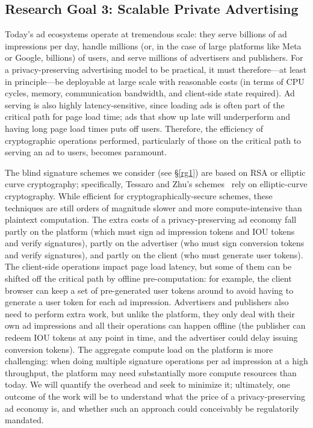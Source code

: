 \subsection{Research Goal 3: Scalable Private Advertising}
\label{s:rg3}

%
Today's ad ecosystems operate at tremendous scale: they serve billions of ad impressions per day, handle millions (or, in the case of large platforms like Meta or Google, billions) of users, and serve millions of advertisers and publishers.
%
For a privacy-preserving advertising model to be practical, it must therefore---at least in principle---be deployable at large scale with reasonable costs (in terms of CPU cycles, memory, communication bandwidth, and client-side state required).
%
Ad serving is also highly latency-sensitive, since loading ads is often part of the critical path for page load time; ads that show up late will underperform and having long page load times puts off users.
%
Therefore, the efficiency of cryptographic operations performed, particularly of those on the critical path to serving an ad to users, becomes paramount.
%

%
The blind signature schemes we consider (see \S\ref{rg1}) are based on RSA or elliptic curve cryptography; specifically, Tessaro and Zhu's schemes~\cite{EC:TesZhu22} rely on elliptic-curve cryptography.
%
While efficient for cryptographically-secure schemes, these techniques are still orders of magnitude slower and more compute-intensive than plaintext computation.
%
The extra costs of a privacy-preserving ad economy fall partly on the platform (which must sign ad impression tokens and IOU tokens and verify signatures), partly on the advertiser (who must sign conversion tokens and verify signatures), and partly on the client (who must generate user tokens).
%
The client-side operations impact page load latency, but some of them can be shifted off the critical path by offline pre-computation: for example, the client browser can keep a set of pre-generated user tokens around to avoid having to generate a user token for each ad impression.
%
Advertisers and publishers also need to perform extra work, but unlike the platform, they only deal with their own ad impressions and all their operations can happen offline (\eg the publisher can redeem IOU tokens at any point in time, and the advertiser could delay issuing conversion tokens).
%
The aggregate compute load on the platform is more challenging: when doing multiple signature operations per ad impression at a high throughput, the platform may need substantially more compute resources than today.
%
We will quantify the overhead and seek to minimize it; ultimately, one outcome of the work will be to understand what the price of a privacy-preserving ad economy is, and whether such an approach could conceivably be regulatorily mandated.
%
